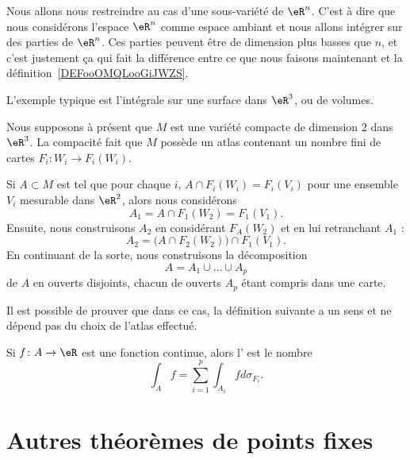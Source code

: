 Nous allons nous restreindre au cas d'une sous-variété de \( \eR^n\). C'est à dire que nous considérons l'espace \( \eR^n\) comme espace ambiant et nous allons intégrer sur des parties de \( \eR^n\). Ces parties peuvent être de dimension plus basses que \( n\), et c'est justement ça qui fait la différence entre ce que nous faisons maintenant et la définition~\ref{DEFooOMQLooGiJWZS}.

L'exemple typique est l'intégrale sur une surface dans \( \eR^3\), ou de volumes.

Nous supposons à présent que $M$ est une variété compacte de dimension $2$ dans $\eR^3$. La compacité fait que $M$ possède un atlas contenant un nombre fini de cartes $F_i\colon W_i\to F_i(W_i)$.

Si $A\subset M$ est tel que pour chaque $i$, $A\cap F_i(W_i)=F_i(V_i)$ pour une ensemble $V_i$ mesurable dans $\eR^2$, alors nous considérons
\begin{equation}
	A_1=A\cap F_1(W_2)=F_1(V_1).
\end{equation}
Ensuite, nous construisons $A_2$ en considérant $F_A(W_2)$ et en lui retranchant $A_1$ :
\begin{equation}
	A_2=\big( A\cap F_2(W_2) \big)\cap F_1(V_1).
\end{equation}
En continuant de la sorte, nous construisons la décomposition
\begin{equation}
	A=A_1\cup\ldots\cup A_p
\end{equation}
de $A$ en ouverts disjoints, chacun de ouverts $A_p$ étant compris dans une carte.

Il est possible de prouver que dans ce cas, la définition suivante a un sens et ne dépend pas du choix de l'atlas effectué.
\begin{definition}
	Si $f\colon A\to \eR$ est une fonction continue, alors l' est le nombre
	\begin{equation}
		\int_Af=\sum_{i=1}^p\int_{A_i}fd\sigma_{F_i}.
	\end{equation}
\end{definition}

\section{Autres théorèmes de points fixes}
\label{SECooDWMPooWZgzRZ}

